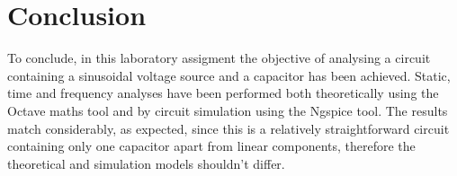 \section{Conclusion}
\label{sec:conclusion}

To conclude, in this laboratory assigment the objective of analysing a circuit containing a sinusoidal voltage source and a capacitor has been achieved. 
Static, time and frequency analyses have been performed both theoretically using the Octave maths tool and by circuit simulation using the Ngspice tool. 
The results match considerably, as expected, since this is a relatively straightforward circuit containing only one capacitor apart from linear components, therefore the theoretical and simulation models shouldn't differ. 